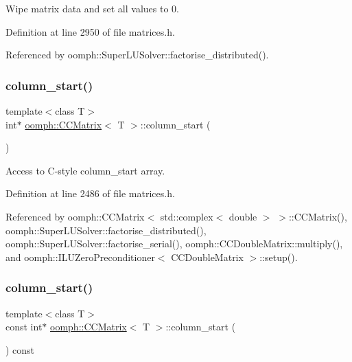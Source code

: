 Wipe matrix data and set all values to 0. 



Definition at line 2950 of file matrices.\+h.



Referenced by oomph\+::\+Super\+L\+U\+Solver\+::factorise\+\_\+distributed().

\mbox{\label{classoomph_1_1CCMatrix_a955390de47c08eb8799550519a1a2751}} 
\subsubsection{\texorpdfstring{column\+\_\+start()}{column\_start()}\hspace{0.1cm}{\footnotesize\ttfamily [1/2]}}
{\footnotesize\ttfamily template$<$class T$>$ \\
int$\ast$ \hyperlink{classoomph_1_1CCMatrix}{oomph\+::\+C\+C\+Matrix}$<$ T $>$\+::column\+\_\+start (\begin{DoxyParamCaption}{ }\end{DoxyParamCaption})\hspace{0.3cm}{\ttfamily [inline]}}



Access to C-\/style column\+\_\+start array. 



Definition at line 2486 of file matrices.\+h.



Referenced by oomph\+::\+C\+C\+Matrix$<$ std\+::complex$<$ double $>$ $>$\+::\+C\+C\+Matrix(), oomph\+::\+Super\+L\+U\+Solver\+::factorise\+\_\+distributed(), oomph\+::\+Super\+L\+U\+Solver\+::factorise\+\_\+serial(), oomph\+::\+C\+C\+Double\+Matrix\+::multiply(), and oomph\+::\+I\+L\+U\+Zero\+Preconditioner$<$ C\+C\+Double\+Matrix $>$\+::setup().

\mbox{\label{classoomph_1_1CCMatrix_a972a8849d0df2ae0908a9a091e471aca}} 
\subsubsection{\texorpdfstring{column\+\_\+start()}{column\_start()}\hspace{0.1cm}{\footnotesize\ttfamily [2/2]}}
{\footnotesize\ttfamily template$<$class T$>$ \\
const int$\ast$ \hyperlink{classoomph_1_1CCMatrix}{oomph\+::\+C\+C\+Matrix}$<$ T $>$\+::column\+\_\+start (\begin{DoxyParamCaption}{ }\end{DoxyParamCaption}) const\hspace{0.3cm}{\ttfamily [inline]}}



